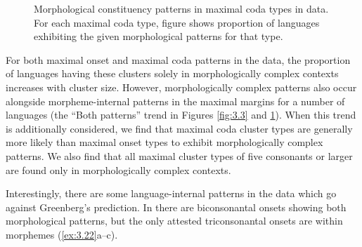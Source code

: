 \begin{figure}
\caption{\label{fig:3.4}Morphological constituency patterns in maximal coda types in data. For each maximal coda type, figure shows proportion of languages exhibiting the given morphological patterns for that type.}
\end{figure}

  For both maximal onset and maximal coda patterns in the data, the proportion of languages having these clusters solely in morphologically complex contexts increases with cluster size. However, morphologically complex patterns also occur alongside morpheme-internal patterns in the maximal margins for a number of languages (the “Both patterns” trend in Figures \ref{fig:3.3} and \ref{fig:3.4}). When this trend is additionally considered, we find that maximal coda cluster types are generally more likely than maximal onset types to exhibit morphologically complex patterns. We also find that all maximal cluster types of five consonants or larger are found only in morphologically complex contexts.

  Interestingly, there are some language-internal patterns in the data which go against Greenberg’s prediction. In  there are biconsonantal onsets showing both morphological patterns, but the only attested triconsonantal onsets are within morphemes (\ref{ex:3.22}a--c).

\ea\label{ex:3.22}

